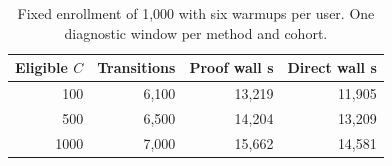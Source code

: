 \begin{table}[t]
\centering
\caption{Fixed enrollment of 1,000 with six warmups per user. One diagnostic window per method and cohort.}
\label{tab:scale-final-cohort}
\footnotesize
\setlength{\tabcolsep}{3pt}
\begin{tabular}{@{}rrrr@{}}
\toprule
Eligible $C$ & Transitions & Proof wall s & Direct wall s \\
\midrule
100 & 6,100 & 13,219 & 11,905 \\
500 & 6,500 & 14,204 & 13,209 \\
1000 & 7,000 & 15,662 & 14,581 \\
\bottomrule
\end{tabular}
\end{table}
